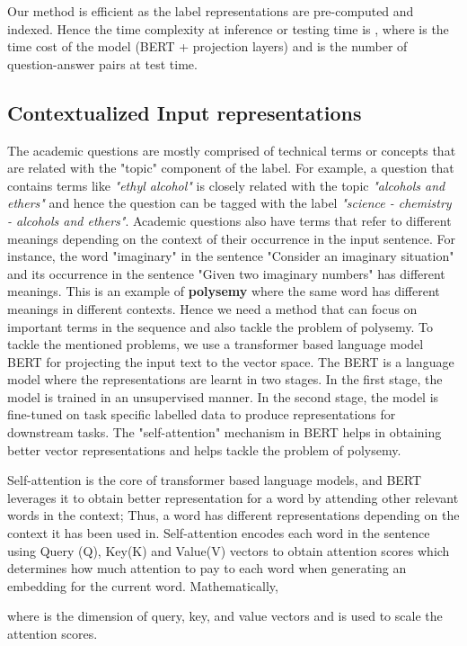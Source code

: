 \documentclass[runningheads, envcountsame, a4paper]{llncs}
\begin{document}
\setlength{\parindent}{4ex}Our method is efficient as the label representations are pre-computed and indexed. Hence the time complexity at inference or testing time is , where  is the time cost of the model (BERT + projection layers) and  is the number of question-answer pairs at test time.
\subsection{Contextualized Input representations}
The academic questions are mostly comprised of technical terms or concepts that are related with the "topic" component of the label. For example, a question that contains terms like \textit{"ethyl alcohol"} is closely related with the topic \textit{"alcohols and ethers"} and hence the question can be tagged with the label \textit{"science - chemistry - alcohols and ethers"}. Academic questions also have terms that refer to different meanings depending on the context of their occurrence in the input sentence. For instance, the word "imaginary" in the sentence "Consider an imaginary situation" and its occurrence in the sentence "Given two imaginary numbers" has different meanings. This is an example of \textbf{polysemy} where the same word has different meanings in different contexts. Hence we need a method that can focus  on important terms in the sequence and also tackle the problem of polysemy. To tackle the mentioned problems, we use a transformer based language model BERT for projecting the input text to the vector space. The BERT is a language model where the representations are learnt in two stages. In the first stage, the model is trained in an unsupervised manner. In the second stage, the model is fine-tuned on task specific labelled data to produce representations for downstream tasks. The "self-attention" mechanism in BERT helps in obtaining better vector representations and helps tackle the problem of polysemy.


Self-attention \cite{vaswani2017attention} is the core of transformer based language models, and BERT leverages it to obtain better representation for a word by attending other relevant words in the context; Thus, a word has different representations depending on the context it has been used in. Self-attention encodes each word in the sentence using Query (Q), Key(K) and Value(V) vectors to obtain attention scores which determines how much attention to pay to each word when generating an embedding for the current word. Mathematically, 


where  is the dimension of query, key, and value vectors and is used to scale the attention scores. 
\end{document}
